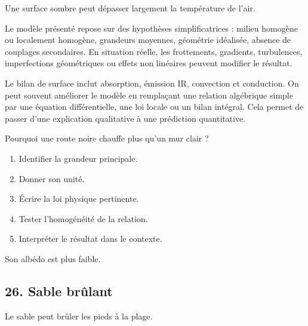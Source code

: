 \documentclass[11pt,a4paper]{article}
\begin{document}
\begin{odgbox}
Une surface sombre peut dépasser largement la température de l'air.
\end{odgbox}

\begin{attentionbox}
Le modèle présenté repose sur des hypothèses simplificatrices : milieu homogène ou localement homogène, grandeurs moyennes, géométrie idéalisée, absence de couplages secondaires. En situation réelle, les frottements, gradients, turbulences, imperfections géométriques ou effets non linéaires peuvent modifier le résultat.
\end{attentionbox}

\begin{approfondissementbox}
Le bilan de surface inclut absorption, émission IR, convection et conduction.
On peut souvent améliorer le modèle en remplaçant une relation algébrique simple par une équation différentielle, une loi locale ou un bilan intégral. Cela permet de passer d'une explication qualitative à une prédiction quantitative.
\end{approfondissementbox}

\begin{exercicebox}
Pourquoi une route noire chauffe plus qu'un mur clair ?
\begin{enumerate}
  \item Identifier la grandeur principale.
  \item Donner son unité.
  \item Écrire la loi physique pertinente.
  \item Tester l'homogénéité de la relation.
  \item Interpréter le résultat dans le contexte.
\end{enumerate}
\end{exercicebox}

\begin{corrigebox}[Indication]
Son albédo est plus faible.
\end{corrigebox}


\subsection{26. Sable brûlant}

\begin{exemplebox}
Le sable peut brûler les pieds à la plage.
\end{exemplebox}
\end{document}
